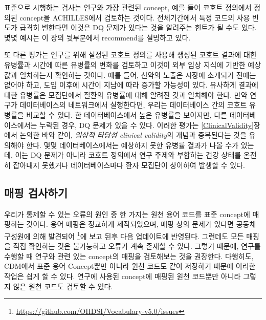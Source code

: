 \documentclass[10.5pt]{book}
\let\rmarkdownfootnote\footnote%
\def\footnote{\protect\rmarkdownfootnote}
\theoremstyle{definition}
\theoremstyle{definition}
\theoremstyle{definition}
\theoremstyle{remark}
\begin{document}
표준으로 시행하는 검사는 연구와 가장 관련된 concept, 예를 들어 코호트
정의에서 정의된 concept을 ACHILLES에서 검토하는 것이다. 전체기간에서
특정 코드의 사용 빈도가 급격히 변한다면 이것은 DQ 문제가 있다는 것을
알려주는 힌트가 될 수도 있다. 몇몇 예시는 이 장의 뒷부분에서 recommend를
설명하고 있다.

또 다른 평가는 연구를 위해 설정된 코호트 정의를 사용해 생성된 코호트
결과에 대한 유병률과 시간에 따른 유병률의 변화를 검토하고 이것이 외부
임상 지식에 기반한 예상값과 일치하는지 확인하는 것이다. 예를 들어,
신약의 노출은 시장에 소개되기 전에는 없어야 하고, 도입 이후에 시간이
지남에 따라 증가할 가능성이 있다. 유사하게 결과에 대한 유병률은
모집단에서 질환의 유병률에 대해 알려진 것과 일치해야 한다. 만약 연구가
데이터베이스의 네트워크에서 실행한다면, 우리는 데이터베이스 간의 코호트
유병률을 비교할 수 있다. 한 데이터베이스에서 높은 유병률을 보이지만,
다른 데이터베이스에서는 누락된 경우, DQ 문제가 있을 수 있다. 이러한
평가는 \ref{ClinicalValidity}장에서 논의한 바와 같이, \emph{임상적
타당성 clinical validity}의 개념과 중복된다는 것을 유의해야 한다. 몇몇
데이터베이스에서는 예상하지 못한 유병률 결과가 나올 수가 있는데, 이는 DQ
문제가 아니라 코호트 정의에서 연구 주제와 부합하는 건강 상태를 온전히
잡아내지 못했거나 데이터베이스마다 환자 모집단이 상이하여 발생할 수
있다.

\subsection{매핑 검사하기}\label{-}

우리가 통제할 수 있는 오류의 원인 중 한 가지는 원천 용어 코드를 표준
concept에 매핑하는 것이다. 용어 매핑은 정교하게 제작되었으며, 매핑 상의
문제가 있다면 공동체 구성원에 의해 발견되어 \footnote{\url{https://github.com/OHDSI/Vocabulary-v5.0/issues}}에
보고 된후 다음 업데이트에 반영된다. 그런데도 모든 매핑을 직접 확인하는
것은 불가능하고 오류가 계속 존재할 수 있다. 그렇기 때문에, 연구를 수행할
때 연구와 관련 있는 concept의 매핑을 검토해보는 것을 권장한다. 다행히도,
CDM에서 표준 용어 Concept뿐만 아니라 원천 코드도 같이 저장하기 때문에
이러한 작업은 쉽게 할 수 있다. 연구에 사용된 concept에 매핑된 원천
코드뿐만 아니라 그렇지 않은 원천 코드도 검토할 수 있다.
\end{document}
